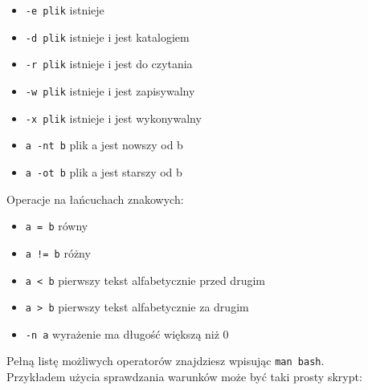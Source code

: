 \begin{itemize}[itemsep=0cm,leftmargin=1cm]
\item \texttt{-e plik} istnieje
\item \texttt{-d plik} istnieje i jest katalogiem
\item \texttt{-r plik} istnieje i jest do czytania
\item \texttt{-w plik} istnieje i jest zapisywalny
\item \texttt{-x plik} istnieje i jest wykonywalny
\item \texttt{a -nt b} plik a jest nowszy od b
\item \texttt{a -ot b} plik a jest starszy od b
\end{itemize}
Operacje na łańcuchach znakowych:
\begin{itemize}[itemsep=0cm,leftmargin=1cm]
\item \texttt{a = b} równy
\item \texttt{a != b} różny
\item \texttt{a < b} pierwszy tekst alfabetycznie przed drugim
\item \texttt{a > b} pierwszy tekst alfabetycznie za drugim
\item \texttt{-n a} wyrażenie ma długość większą niż 0
\end{itemize}
Pełną listę możliwych operatorów znajdziesz wpisując \texttt{man bash}.\\
Przykładem użycia sprawdzania warunków może być taki prosty skrypt:


